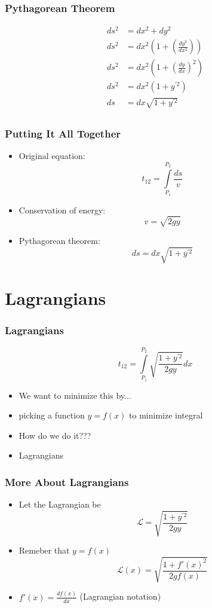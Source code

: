 \documentclass[12pt]{beamer}
\begin{document}
\begin{frame}
\frametitle{Pythagorean Theorem}
\begin{align*}
    ds^2 &= dx^2 + dy^2 \\
    ds^2 &= dx^2 \left ( 1 + \left ( \frac{dy^2}{dx^2} \right) \right) \\
    ds^2 &= dx^2 \left ( 1 + \left ( \frac{dy}{dx} \right)^2 \right) \\
    ds^2 &= dx^2 \left ( 1 + y^{'2} \right ) \\
    ds &= dx \sqrt{1 + y^{'2}} \\
\end{align*}
\end{frame}

\begin{frame}
\frametitle{Putting It All Together}
\begin{itemize}
    \item Original equation:
    $$
    t_{12} = \int \limits_{P_1}^{P_2} \frac{ds}{v}
    $$
    \pause
    \item Conservation of energy:
    $$
    v = \sqrt{2gy}
    $$
    \pause
    \item Pythagorean theorem:
    $$
    ds = dx \sqrt{1 + y^{'2}}
    $$
\end{itemize}
\end{frame}

\section{Lagrangians}
\begin{frame}
\frametitle{Lagrangians}
    $$
    t_{12} = \int \limits_{P_1}^{P_2} \sqrt{\frac{1 + y^{'2}}{2gy}} dx
    $$
\pause
\begin{itemize}
    \item We want to minimize this by...
    \pause
    \item picking a function $y = f(x)$ to minimize integral
    \pause
    \item How do we do it???
    \pause
    \item Lagrangians
\end{itemize}
\end{frame}

\begin{frame}
\frametitle{More About Lagrangians}
\begin{itemize}
    \item Let the Lagrangian be
    $$
    \mathcal{L} = \sqrt{\frac{1 + y^{'2}}{2gy}}
    $$
    \pause
    \item Remeber that $y = f(x)$
    $$
    \mathcal{L}(x) = \sqrt{\frac{1 + f'(x)^2}{2gf(x)}}
    $$
    \item $f'(x) = \frac{df(x)}{dx}$ (Lagrangian notation)
\end{itemize}
\end{frame}
\end{document}
